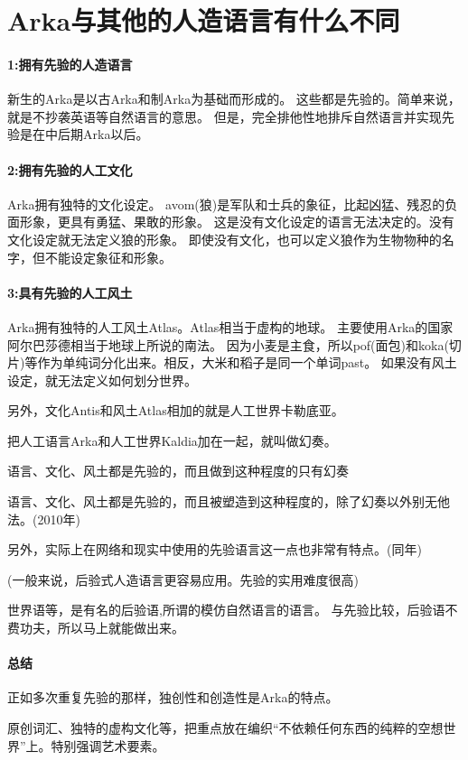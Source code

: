 \chapter[Arka与其他的人造语言有什么不同]{Arka与其他的人造语言有什么不同}

\subsubsection{1:拥有先验的人造语言}

新生的Arka是以古Arka和制Arka为基础而形成的。
这些都是先验的。简单来说，就是不抄袭英语等自然语言的意思。
但是，完全排他性地排斥自然语言并实现先验是在中后期Arka以后。

\subsubsection{2:拥有先验的人工文化}

Arka拥有独特的文化设定。
avom(狼)是军队和士兵的象征，比起凶猛、残忍的负面形象，更具有勇猛、果敢的形象。
这是没有文化设定的语言无法决定的。没有文化设定就无法定义狼的形象。
即使没有文化，也可以定义狼作为生物物种的名字，但不能设定象征和形象。

\subsubsection{3:具有先验的人工风土}

Arka拥有独特的人工风土Atlas。Atlas相当于虚构的地球。
主要使用Arka的国家阿尔巴莎德相当于地球上所说的南法。
因为小麦是主食，所以pof(面包)和koka(切片)等作为单纯词分化出来。相反，大米和稻子是同一个单词past。
如果没有风土设定，就无法定义如何划分世界。

另外，文化Antis和风土Atlas相加的就是人工世界卡勒底亚。

把人工语言Arka和人工世界Kaldia加在一起，就叫做幻奏。

语言、文化、风土都是先验的，而且做到这种程度的只有幻奏

语言、文化、风土都是先验的，而且被塑造到这种程度的，除了幻奏以外别无他法。(2010年)

另外，实际上在网络和现实中使用的先验语言这一点也非常有特点。(同年)

(一般来说，后验式人造语言更容易应用。先验的实用难度很高)

世界语等，是有名的后验语,所谓的模仿自然语言的语言。
与先验比较，后验语不费功夫，所以马上就能做出来。

\subsubsection{总结}

正如多次重复先验的那样，独创性和创造性是Arka的特点。

原创词汇、独特的虚构文化等，把重点放在编织“不依赖任何东西的纯粹的空想世界”上。特别强调艺术要素。